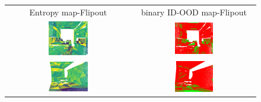     \begin{figure}[h!]
        \centering
        \begin{tabular}{cc}
            Entropy map-Flipout & binary ID-OOD map-Flipout \\
            \includegraphics[width=0.33\textwidth, height=0.18\textheight]{images/ood_imgs/fout_s3dis/ofc_3_fout_ent.pdf}& 
            \includegraphics[width=0.33\textwidth, height=0.18\textheight]{images/ood_imgs/fout_s3dis/fout_ent_2.pdf}\\

            \includegraphics[width=0.33\textwidth, height=0.18\textheight]{images/ood_imgs/fout_s3dis/cf1_fout_ent.pdf}& 
            \includegraphics[width=0.33\textwidth, height=0.18\textheight]{images/ood_imgs/fout_s3dis/fout_ent_4.pdf}\\


\end{tabular}
\end{figure}
